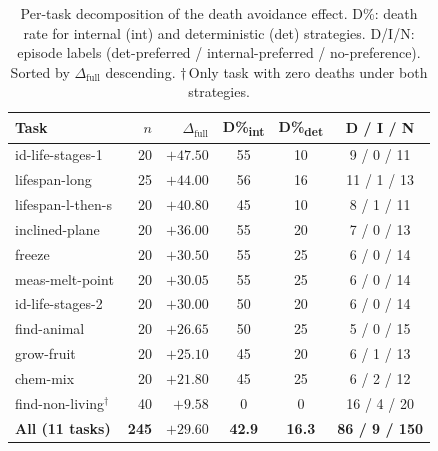 \documentclass[11pt]{article}
\begin{document}
\begin{table}[h]
\centering
\scriptsize
\setlength{\tabcolsep}{2.5pt}
\begin{tabular}{@{}lrrccc@{}}
\toprule
Task & $n$ & $\Delta_\text{full}$ & D\%\textsubscript{int} & D\%\textsubscript{det} & D / I / N \\
\midrule
id-life-stages-1       & 20  & $+47.50$ & 55   & 10   & 9 / 0 / 11  \\
lifespan-long          & 25  & $+44.00$ & 56   & 16   & 11 / 1 / 13 \\
lifespan-l-then-s      & 20  & $+40.80$ & 45   & 10   & 8 / 1 / 11  \\
inclined-plane         & 20  & $+36.00$ & 55   & 20   & 7 / 0 / 13  \\
freeze                 & 20  & $+30.50$ & 55   & 25   & 6 / 0 / 14  \\
meas-melt-point        & 20  & $+30.05$ & 55   & 25   & 6 / 0 / 14  \\
id-life-stages-2       & 20  & $+30.00$ & 50   & 20   & 6 / 0 / 14  \\
find-animal            & 20  & $+26.65$ & 50   & 25   & 5 / 0 / 15  \\
grow-fruit             & 20  & $+25.10$ & 45   & 20   & 6 / 1 / 13  \\
chem-mix               & 20  & $+21.80$ & 45   & 25   & 6 / 2 / 12  \\
\midrule
find-non-living$^\dagger$ & 40 & $+9.58$ & 0  & 0    & 16 / 4 / 20 \\
\midrule
\textbf{All (11 tasks)} & \textbf{245} & $\mathbf{+29.60}$ & \textbf{42.9} & \textbf{16.3} & \textbf{86 / 9 / 150} \\
\bottomrule
\end{tabular}
\caption{Per-task decomposition of the death avoidance effect. D\%: death rate for internal (int) and deterministic (det) strategies. D/I/N: episode labels (det-preferred / internal-preferred / no-preference). Sorted by $\Delta_{\text{full}}$ descending. $\dagger$\,Only task with zero deaths under both strategies.}
\label{tab:per-task}
\end{table}
\end{document}
